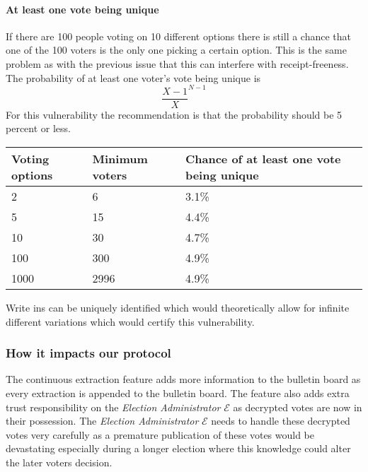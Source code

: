 \paragraph{At least one vote being unique}
If there are 100 people voting on 10 different options there is still a chance that one of the 100 voters is the only one picking a certain option. This is the same problem as with the previous issue that this can interfere with receipt-freeness. 
\noindent The probability of at least one voter's vote being unique is \[ \frac{X-1}{X}^{N-1} \]
For this vulnerability the recommendation is that the probability should be 5 percent or less.
\begin{table}[H]
\begin{tabular}{|l|l|l|}
\hline
Voting options & Minimum voters & Chance of at least one vote being unique \\ \hline
2                   & 6           &  3.1\%                           \\ \hline
5                   & 15          &  4.4\%                         \\ \hline
10                  & 30          &  4.7\%                         \\ \hline
100                 & 300         &  4.9\%                         \\ \hline
1000                & 2996        &  4.9\%                         \\ \hline
\end{tabular}
\end{table}

Write ins can be uniquely identified which would theoretically allow for infinite different variations which would certify this vulnerability.


\subsubsection{How it impacts our protocol}
The continuous extraction feature adds more information to the bulletin board as every extraction is appended to the bulletin board. The feature also adds extra trust responsibility on the \textit{Election Administrator} $\mathcal{E}$ as decrypted votes are now in their possession. The \textit{Election Administrator} $\mathcal{E}$ needs to handle these decrypted votes very carefully as a premature publication of these votes would be devastating especially during a longer election where this knowledge could alter the later voters decision.



